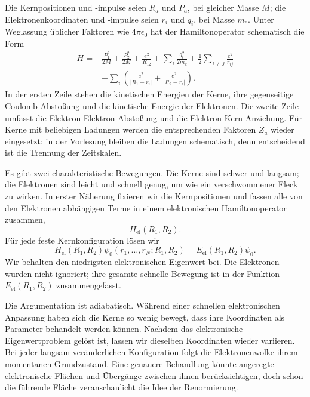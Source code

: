 Die Kernpositionen und -impulse seien \(R_a\) und \(P_a\), bei gleicher Masse \(M\); die Elektronenkoordinaten und -impulse seien \(r_i\) und \(q_i\), bei Masse \(m_e\). Unter Weglassung üblicher Faktoren wie \(4\pi\epsilon_0\) hat der Hamiltonoperator schematisch die Form \begin{align}
H={}&
\frac{P_1^2}{2M}+\frac{P_2^2}{2M}
+\frac{e^2}{R_{12}}
+\sum_i\frac{q_i^2}{2m_e}
+\frac12\sum_{i\ne j}\frac{e^2}{r_{ij}}
\nonumber\\
&-\sum_i\left(
\frac{e^2}{|R_1-r_i|}
+\frac{e^2}{|R_2-r_i|}
\right).
\label{eq:molecular-hamiltonian}
\end{align}In der ersten Zeile stehen die kinetischen Energien der Kerne, ihre gegenseitige Coulomb-Abstoßung und die kinetische Energie der Elektronen. Die zweite Zeile umfasst die Elektron-Elektron-Abstoßung und die Elektron-Kern-Anziehung. Für Kerne mit beliebigen Ladungen werden die entsprechenden Faktoren \(Z_a\) wieder eingesetzt; in der Vorlesung bleiben die Ladungen schematisch, denn entscheidend ist die Trennung der Zeitskalen.

Es gibt zwei charakteristische Bewegungen. Die Kerne sind schwer und langsam; die Elektronen sind leicht und schnell genug, um wie ein verschwommener Fleck zu wirken. In erster Näherung fixieren wir die Kernpositionen und fassen alle von den Elektronen abhängigen Terme in einem elektronischen Hamiltonoperator zusammen, \begin{equation}
H_{\mathrm{el}}(R_1,R_2).
\end{equation}Für jede feste Kernkonfiguration lösen wir \begin{equation}
H_{\mathrm{el}}(R_1,R_2)
\psi_0(r_1,\ldots,r_N;R_1,R_2)
=
E_{\mathrm{el}}(R_1,R_2)\psi_0.
\label{eq:electronic-ground-state}
\end{equation}Wir behalten den niedrigsten elektronischen Eigenwert bei. Die Elektronen wurden nicht ignoriert; ihre gesamte schnelle Bewegung ist in der Funktion \(E_{\mathrm{el}}(R_1,R_2)\) zusammengefasst.

Die Argumentation ist adiabatisch. Während einer schnellen elektronischen Anpassung haben sich die Kerne so wenig bewegt, dass ihre Koordinaten als Parameter behandelt werden können. Nachdem das elektronische Eigenwertproblem gelöst ist, lassen wir dieselben Koordinaten wieder variieren. Bei jeder langsam veränderlichen Konfiguration folgt die Elektronenwolke ihrem momentanen Grundzustand. Eine genauere Behandlung könnte angeregte elektronische Flächen und Übergänge zwischen ihnen berücksichtigen, doch schon die führende Fläche veranschaulicht die Idee der Renormierung.

